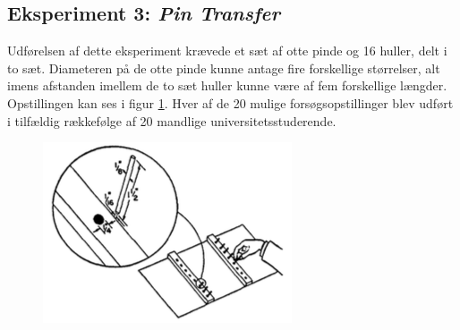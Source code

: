 \subsection*{Eksperiment 3: \textit{Pin Transfer}}
Udførelsen af dette eksperiment krævede et sæt af otte pinde og 16 huller, delt i to sæt. Diameteren på de otte pinde kunne antage fire forskellige størrelser, alt imens afstanden imellem de to sæt huller kunne være af fem forskellige længder. Opstillingen kan ses i figur \ref{fig:FittsEx3}.
Hver af de 20 mulige forsøgsopstillinger blev udført i tilfældig rækkefølge af 20 mandlige universitetsstuderende.
\begin{figure}[h]
\centering
\includegraphics[width=0.5\linewidth]{images/illustrations/fitt_ex3}
\label{fig:FittsEx3}
\end{figure}

